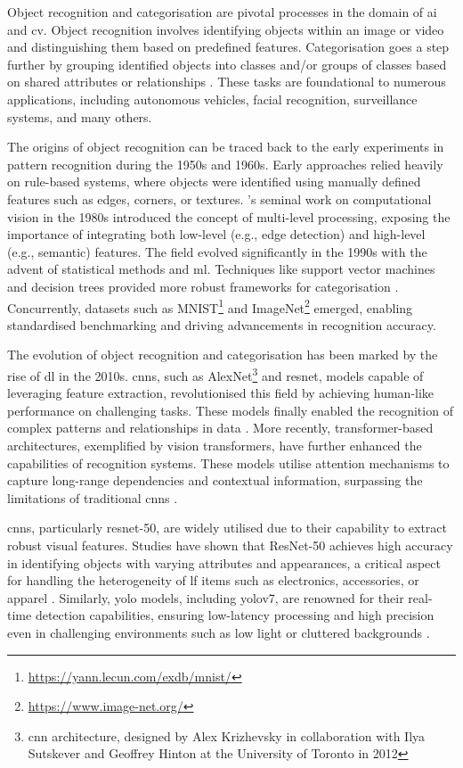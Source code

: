 Object recognition and categorisation are pivotal processes in the domain of \ac{ai} and \ac{cv}. Object recognition involves identifying objects within an image or video and distinguishing them based on predefined features. Categorisation goes a step further by grouping identified objects into classes and/or groups of classes based on shared attributes or relationships \cite{Liu2021}. These tasks are foundational to numerous applications, including autonomous vehicles, facial recognition, surveillance systems, and many others.

The origins of object recognition can be traced back to the early experiments in pattern recognition during the 1950s and 1960s. Early approaches relied heavily on rule-based systems, where objects were identified using manually defined features such as edges, corners, or textures. 's seminal work on computational vision in the 1980s introduced the concept of multi-level processing, exposing the importance of integrating both low-level (e.g., edge detection) and high-level (e.g., semantic) features. The field evolved significantly in the 1990s with the advent of statistical methods and \ac{ml}. Techniques like support vector machines and decision trees provided more robust frameworks for categorisation \cite{Bishop2006}. Concurrently, datasets such as MNIST\footnote{\url{https://yann.lecun.com/exdb/mnist/}} and ImageNet\footnote{\url{https://www.image-net.org/}} emerged, enabling standardised benchmarking and driving advancements in recognition accuracy.

The evolution of object recognition and categorisation has been marked by the rise of \ac{dl} in the 2010s. \acp{cnn}, such as AlexNet\footnote{\ac{cnn} architecture, designed by Alex Krizhevsky in collaboration with Ilya Sutskever and Geoffrey Hinton at the University of Toronto in 2012} and \ac{resnet}, models capable of leveraging feature extraction, revolutionised this field by achieving human-like performance on challenging tasks. These models finally enabled the recognition of complex patterns and relationships in data \cites{He2015, Krizhevsky2017}. More recently, transformer-based architectures, exemplified by vision transformers, have further enhanced the capabilities of recognition systems. These models utilise attention mechanisms to capture long-range dependencies and contextual information, surpassing the limitations of traditional \acp{cnn} \cite{Dosovitskiy2020}.

\acp{cnn}, particularly \ac{resnet}-50, are widely utilised due to their capability to extract robust visual features. Studies have shown that ResNet-50 achieves high accuracy in identifying objects with varying attributes and appearances, a critical aspect for handling the heterogeneity of \ac{lf} items such as electronics, accessories, or apparel \cites{Prawira2024, Ghazal2016, Liu2022}. Similarly, \ac{yolo} models, including \ac{yolo}v7, are renowned for their real-time detection capabilities, ensuring low-latency processing and high precision even in challenging environments such as low light or cluttered backgrounds \cites{Sharma2024, Vedanth2024}.

